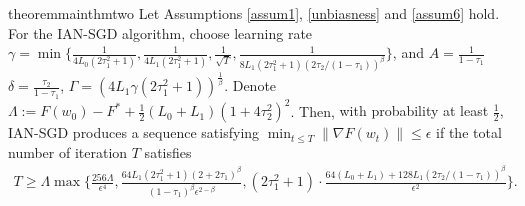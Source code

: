 \documentclass[10pt]{article} %
\begin{document}
\begin{restatable}{theorem}{mainthmtwo}
\label{Clip SGD converge}
    Let Assumptions \ref{assum1}, \ref{unbiasness} and \ref{assum6} hold. For the IAN-SGD algorithm, choose learning rate 
     $\gamma = \min \{ \frac{1}{4L_0(2\tau_1^2+1)},\frac{1}{4L_1(2\tau_1^2+1)}, \frac{1}{\sqrt{T}}, \frac{1}{8L_1(2\tau_1^2+1)(2\tau_2/(1-\tau_1))^{\beta}}\}$, and $A=\frac{1}{1-\tau_1}$ $\delta = \frac{\tau_2}{1-\tau_1}$, $\Gamma=(4L_1\gamma(2\tau_1^2+1))^{\frac{1}{\beta}}$. Denote $\Lambda := F(w_0)-F^* + \frac{1}{2}(L_0+L_1)(1+ 4\tau_2^2)^2$. Then, {with probability at least $\frac{1}{2}$,} IAN-SGD produces a sequence satisfying $\min_{t \le T}\|\nabla F(w_t) \|\leq \epsilon$ if the total number of iteration $T$ satisfies  
     \begin{align}
                T \geq \Lambda \max \Big\{\frac{256\Lambda}{\epsilon^4}, \frac{64L_1(2\tau_1^2+1)(2+2\tau_1)^{\beta}}{(1-\tau_1)^{\beta}\epsilon^{2-\beta}}, (2\tau_1^2+1)\cdot\frac{64(L_0+L_1)+128L_1(2\tau_2/(1-\tau_1))^{\beta}}{\epsilon^2} \Big\}.
          \label{stochastic iteration complexity}
    \end{align}
\end{restatable}
\end{document}
